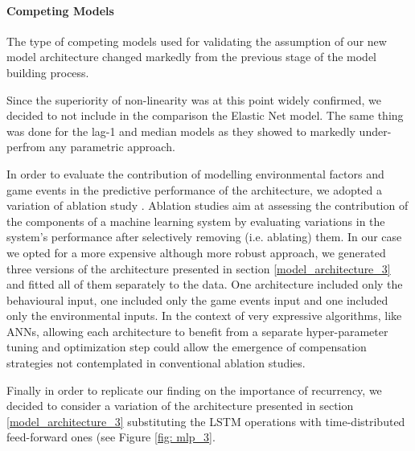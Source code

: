 \paragraph*{Competing Models}
\label{competing_models_3}
The type of competing models used for validating the assumption of our new model architecture changed markedly from the previous stage of the model building process. 

Since the superiority of non-linearity was at this point widely confirmed, we decided to not include in the comparison the Elastic Net model. The same thing was done for the lag-1 and median models as they showed to markedly under-perfrom any parametric approach. 

In order to evaluate the contribution of modelling environmental factors and game events in the predictive performance of the architecture, we adopted a variation of ablation study \cite{meyes2019ablation}. Ablation studies aim at assessing the contribution of the components of a machine learning system by evaluating variations in the system's performance after selectively removing (i.e. ablating) them. In our case we opted for a more expensive although more robust approach, we generated three versions of the architecture presented in section \ref{model_architecture_3} and fitted all of them separately to the data. One architecture included only the behavioural input, one included only the game events input and one included only the environmental inputs. In the context of very expressive algorithms, like ANNs, allowing each architecture to benefit from a separate hyper-parameter tuning and optimization step could allow the emergence of compensation strategies not contemplated in conventional ablation studies. 

Finally in order to replicate our finding on the importance of recurrency, we decided to consider a variation of the architecture presented in section \ref{model_architecture_3} substituting the LSTM operations with time-distributed feed-forward ones (see Figure \ref{fig: mlp_3}.


